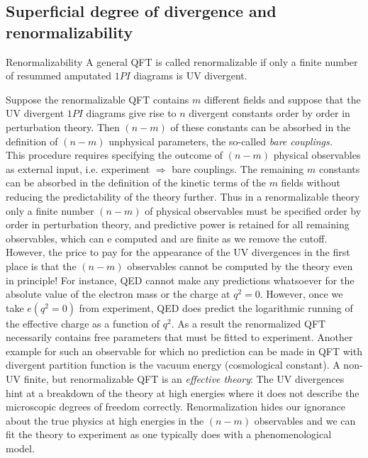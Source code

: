 \subsection{Superficial degree of divergence and renormalizability}
\begin{mybox}{Renormalizability}
	A general QFT is called renormalizable if only a finite number of resummed amputated $1PI$ diagrams is UV divergent.
\end{mybox}
Suppose the renormalizable QFT contains $m$ different fields and suppose that the UV divergent $1PI$ diagrams give rise to $n$ divergent constants order by order in perturbation theory. Then $(n-m)$ of these constants can be absorbed in the definition of $(n-m)$ unphysical parameters, the so-called \emph{bare couplings.}\\
This procedure requires specifying the outcome of $(n-m)$ physical observables as external input, i.e. experiment $\Rightarrow$ bare couplings. The remaining $m$ constants can be absorbed in the definition of the kinetic terms of the $m$ fields without reducing the predictability of the theory further. Thus in a renormalizable theory only a finite number $(n-m)$ of physical observables must be specified order by order in perturbation theory, and predictive power is retained for all remaining observables, which can e computed and are finite as we remove the cutoff.\\
However, the price to pay for the appearance of the UV divergences in the first place is that the $(n-m)$ observables cannot be computed by the theory even in principle! For instance, QED cannot make any predictions whatsoever for the absolute value of the electron mass or the charge at $q^2=0$. However, once we take $e(q^2=0)$ from experiment, QED does predict the logarithmic running of the effective charge as a function of $q^2$. As a result the renormalized QFT necessarily contains free parameters that must be fitted to experiment. Another example for such an observable for which no prediction can be made in QFT with divergent partition function is the vacuum energy (cosmological constant). A non-UV finite, but renormalizable QFT is an \emph{effective theory}: The UV divergences hint at a breakdown of the theory at high energies where it does not describe the microscopic degrees of freedom correctly. Renormalization hides our ignorance about the true physics at high energies in the $(n-m)$ observables and we can fit the theory to experiment as one typically does with a phenomenological model.
\\
